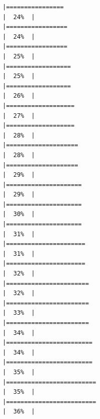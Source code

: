 \documentclass[
]{article}
\begin{document}
\begin{verbatim}
|================                                                      |  24%  |                                                                              |=================                                                     |  24%  |                                                                              |=================                                                     |  25%  |                                                                              |==================                                                    |  25%  |                                                                              |==================                                                    |  26%  |                                                                              |===================                                                   |  27%  |                                                                              |===================                                                   |  28%  |                                                                              |====================                                                  |  28%  |                                                                              |====================                                                  |  29%  |                                                                              |=====================                                                 |  29%  |                                                                              |=====================                                                 |  30%  |                                                                              |=====================                                                 |  31%  |                                                                              |======================                                                |  31%  |                                                                              |======================                                                |  32%  |                                                                              |=======================                                               |  32%  |                                                                              |=======================                                               |  33%  |                                                                              |=======================                                               |  34%  |                                                                              |========================                                              |  34%  |                                                                              |========================                                              |  35%  |                                                                              |=========================                                             |  35%  |                                                                              |=========================                                             |  36%  |                                                                              
\end{verbatim}
\end{document}
